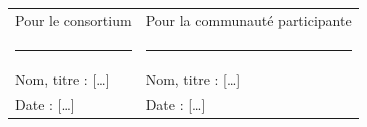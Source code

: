 \label{art-duree}

\label{art-differends}

\label{art-signatures}
\vspace{0.5em}
\noindent
\begin{tabularx}{\linewidth}{@{}XX@{}}
Pour le consortium \fedesante{} & Pour la communauté participante \\[2.5em]
\rule{0.9\linewidth}{0.4pt} & \rule{0.9\linewidth}{0.4pt} \\
Nom, titre : [\ldots] & Nom, titre : [\ldots] \\
Date : [\ldots] & Date : [\ldots] \\
\end{tabularx}\par
